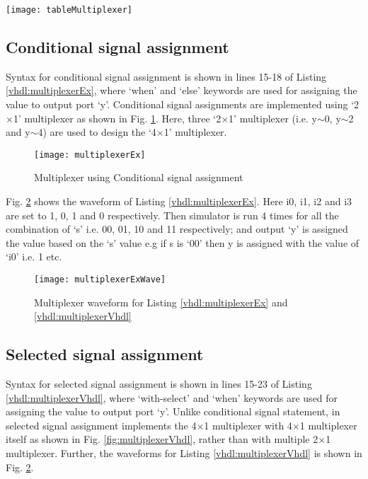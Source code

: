 \begin{table}[!h]
	\centering
	\texttt{[image: tableMultiplexer]}
	\caption{Truth table of 4$\times$1 multiplexer}
	\label{tbl:Multiplexer}
\end{table}


\subsection{Conditional signal assignment}

Syntax for conditional signal assignment is shown in lines 15-18 of Listing \ref{vhdl:multiplexerEx}, where `when' and `else' keywords are used for assigning the value to output port `y'. Conditional signal assignments are implemented using `2$\times$1' multiplexer as shown in Fig. \ref{fig:multiplexerEx}. Here, three `2$\times$1' multiplexer (i.e. y$\sim$0, y$\sim$2 and y$\sim$4) are used to design the `4$\times$1' multiplexer.




\begin{figure}[!h]
	\centering
	\texttt{[image: multiplexerEx]}
	\caption{Multiplexer using Conditional signal assignment}
	\label{fig:multiplexerEx}
\end{figure}

Fig. \ref{fig:multiplexerExWave} shows the waveform of Listing \ref{vhdl:multiplexerEx}. Here i0, i1, i2 and i3 are set to 1, 0, 1 and 0 respectively. Then simulator is run 4 times for all the combination of `s' i.e. 00, 01, 10 and 11 respectively; and output `y' is assigned the value based on the `s' value e.g if s is `00' then y is assigned with the value of `i0' i.e. 1 etc.  

\begin{figure}[!h]
	\centering
	\texttt{[image: multiplexerExWave]}
	\caption{Multiplexer waveform for Listing \ref{vhdl:multiplexerEx} and \ref{vhdl:multiplexerVhdl}}
	\label{fig:multiplexerExWave}
\end{figure}



\subsection{Selected signal assignment}
Syntax for selected signal assignment is shown in lines 15-23 of Listing \ref{vhdl:multiplexerVhdl}, where `with-select' and `when' keywords are used for assigning the value to output port `y'. Unlike conditional signal statement, in selected signal assignment implements the 4$\times$1 multiplexer with 4$\times$1 multiplexer itself as shown in Fig. \ref{fig:multiplexerVhdl}, rather than with multiple 2$\times$1 multiplexer. Further, the waveforms for Listing \ref{vhdl:multiplexerVhdl} is shown in Fig. \ref{fig:multiplexerExWave}.

